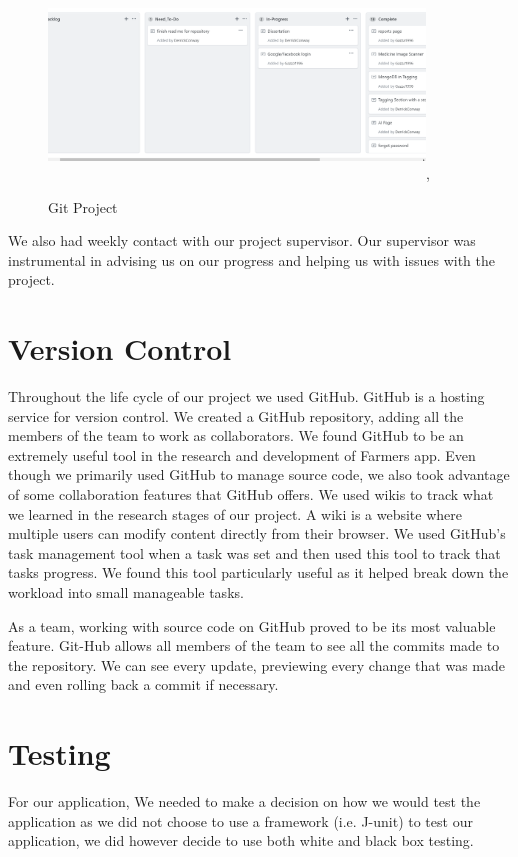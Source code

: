 \documentclass[12pt,a4paper,oneside,openany]{book}
\begin{document}
\begin{figure}[ht]
\renewcommand\thefigure{3.1}
\centering
\includegraphics[width=10cm, height=5cm]{Images/gitproject.png},
\caption{Git Project}
\label{Github Projects}
\end{figure}

\noindent We also had weekly contact with our project supervisor. Our supervisor was instrumental in advising us on our progress and helping us with issues with the project.

\section{Version Control}
Throughout the life cycle of our project we used GitHub. GitHub is a hosting service for version control. We created a GitHub repository, adding all the members of the team to work as collaborators. We found GitHub to be an extremely useful tool in the research and development of Farmers app. Even though we primarily used GitHub to manage source code, we also took advantage of some collaboration features that GitHub offers. We used wikis to track what we learned in the research stages of our project. A wiki is a website where multiple users can modify content directly from their browser. We used GitHub’s task management tool when a task was set and then used this tool to track that tasks progress.  We found this tool particularly useful as it helped break down the workload into small manageable tasks.

\noindent As a team, working with source code on GitHub proved to be its most valuable feature. Git-Hub allows all members of the team to see all the commits made to the repository. We can see every update, previewing every change that was made and even rolling back a commit if necessary.

\section{Testing}
For our application, We needed to make a decision on how we would test the application as we did not choose to use a framework (i.e. J-unit) to test our application, we did however decide to use both white and black box testing.
\end{document}
